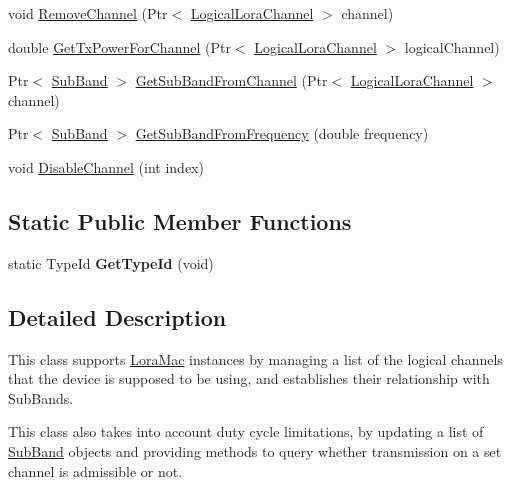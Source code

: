 \begin{DoxyCompactItemize}
\item 
void \hyperlink{classns3_1_1lorawan_1_1LogicalLoraChannelHelper_a0d83beba832f0ead33ff0defb82d2f70}{Remove\+Channel} (Ptr$<$ \hyperlink{classns3_1_1lorawan_1_1LogicalLoraChannel}{Logical\+Lora\+Channel} $>$ channel)
\item 
double \hyperlink{classns3_1_1lorawan_1_1LogicalLoraChannelHelper_a17e3eb7c0412eb5a859082c549e8f1f9}{Get\+Tx\+Power\+For\+Channel} (Ptr$<$ \hyperlink{classns3_1_1lorawan_1_1LogicalLoraChannel}{Logical\+Lora\+Channel} $>$ logical\+Channel)
\item 
Ptr$<$ \hyperlink{classns3_1_1lorawan_1_1SubBand}{Sub\+Band} $>$ \hyperlink{classns3_1_1lorawan_1_1LogicalLoraChannelHelper_af55c016ff95a8002eeb1c8143c79d1b2}{Get\+Sub\+Band\+From\+Channel} (Ptr$<$ \hyperlink{classns3_1_1lorawan_1_1LogicalLoraChannel}{Logical\+Lora\+Channel} $>$ channel)
\item 
Ptr$<$ \hyperlink{classns3_1_1lorawan_1_1SubBand}{Sub\+Band} $>$ \hyperlink{classns3_1_1lorawan_1_1LogicalLoraChannelHelper_a204fd2ee7705861c0d1109ab868eb126}{Get\+Sub\+Band\+From\+Frequency} (double frequency)
\item 
void \hyperlink{classns3_1_1lorawan_1_1LogicalLoraChannelHelper_a37666f3b287d6abd53e8c3b485e77f96}{Disable\+Channel} (int index)
\end{DoxyCompactItemize}
\subsection*{Static Public Member Functions}
\begin{DoxyCompactItemize}
\item 
\mbox{\label{classns3_1_1lorawan_1_1LogicalLoraChannelHelper_aaf1148911481b44e4b7e6e140a788ece}} 
static Type\+Id {\bfseries Get\+Type\+Id} (void)
\end{DoxyCompactItemize}


\subsection{Detailed Description}
This class supports \hyperlink{classns3_1_1lorawan_1_1LoraMac}{Lora\+Mac} instances by managing a list of the logical channels that the device is supposed to be using, and establishes their relationship with Sub\+Bands.

This class also takes into account duty cycle limitations, by updating a list of \hyperlink{classns3_1_1lorawan_1_1SubBand}{Sub\+Band} objects and providing methods to query whether transmission on a set channel is admissible or not. 

